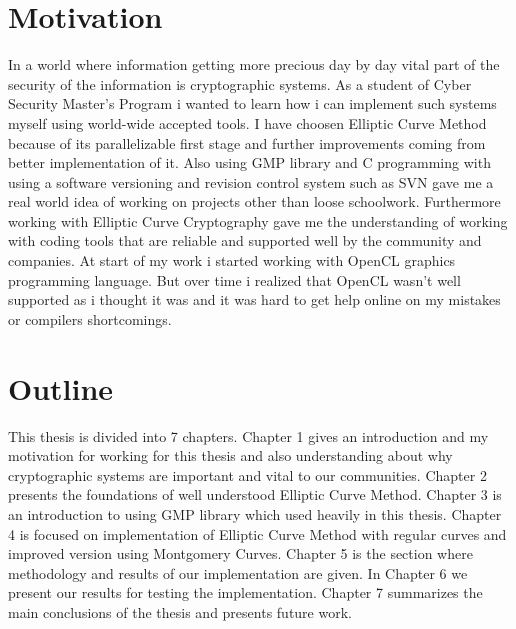 
\section{Motivation}
In a world where information getting more precious day by day vital part of the
security of the information is cryptographic systems. As a student of Cyber
Security Master's Program i wanted to learn how i can implement such systems
myself using world-wide accepted tools. I have choosen Elliptic Curve Method
because of its parallelizable first stage and further improvements coming from
better implementation of it. 
Also using GMP library and C programming with using a software versioning and
revision control system such as SVN gave me a real world idea of working on
projects other than loose schoolwork.
Furthermore working with Elliptic Curve Cryptography gave me the understanding
of working with coding tools that are reliable and supported well by the
community and companies. At start of my work i started working with OpenCL
graphics programming language. But over time i realized that OpenCL wasn't well
supported as i thought it was and it was hard to get help online on my mistakes
or compilers shortcomings.

\section{Outline}
This thesis is divided into 7 chapters. Chapter 1 gives an introduction and my
motivation for working for this thesis and also understanding about why
cryptographic systems are important and vital to our communities. Chapter 2
presents the foundations of well understood Elliptic Curve Method. Chapter 3 is
an introduction to using GMP library which used heavily in this thesis. Chapter
4 is focused on implementation of Elliptic Curve Method with regular curves and
improved version using Montgomery Curves. Chapter 5 is the section where
methodology and results of our implementation are given. In Chapter 6 we present
our results for testing the implementation. Chapter 7  summarizes the main
conclusions of the thesis and presents future work. 

